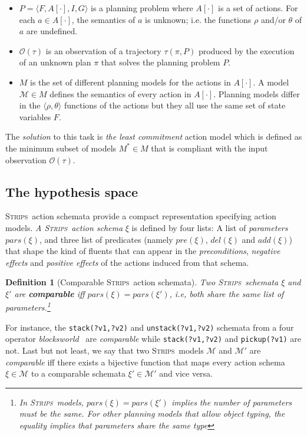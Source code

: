 \documentclass{article}
\newcommand{\tup}[1]{{\langle #1 \rangle}}
\newcommand{\strips}{\textsc{Strips}}
\newtheorem{definition}[theorem]{Definition}
\begin{document}
\begin{itemize}
\item $P=\tup{F,A[\cdot],I,G}$ is a planning problem where $A[\cdot]$ is a set of actions. For each $a\in A[\cdot]$, the semantics of $a$ is unknown; i.e. the functions $\rho$ and/or $\theta$ of $a$ are undefined.
\item $\mathcal{O}(\tau)$ is an observation of a trajectory $\tau(\pi,P)$ produced by the execution of an unknown plan $\pi$ that solves the planning problem $P$.
\item $M$ is the set of different planning models for the actions in $A[\cdot]$. A model $\mathcal{M}\in M$ defines the semantics of every action in $A[\cdot]$. Planning models differ in the $\tup{\rho,\theta}$ functions of the actions but they all use the same set of state variables $F$.
\end{itemize}

The {\em solution} to this task is {\em the least commitment} action model which is defined as the minimum subset of models $M^*\in M$ that is compliant with the input observation $\mathcal{O}(\tau)$.

\subsection{The hypothesis space}
\strips\ action schemata provide a compact representation specifying action models. {\em A \strips\ action schema} $\xi$ is defined by four lists: A list of {\em parameters} $pars(\xi)$, and three list of predicates (namely $pre(\xi)$, $del(\xi)$ and $add(\xi)$) that shape the kind of fluents that can appear in the {\em preconditions}, {\em negative effects} and {\em positive effects} of the actions induced from that schema.

\begin{definition}[Comparable \strips\ action schemata]
Two \strips\ schemata $\xi$ and $\xi'$ are {\bf comparable} iff $pars(\xi)=pars(\xi')$, i.e, both share the same list of parameters.\footnote{In \strips\ models, $pars(\xi)=pars(\xi')$ implies the number of parameters must be the same. For other planning models that allow object typing, the equality implies that parameters share the same type}
\end{definition}

For instance, the {\small\tt stack(?v1,?v2)} and {\small\tt unstack(?v1,?v2)} schemata from a four operator {\em blocksworld}~\cite{slaney2001blocks} are {\em comparable} while {\small\tt stack(?v1,?v2)} and {\small\tt pickup(?v1)} are not. Last but not least, we say that two \strips\ models $\mathcal{M}$ and $\mathcal{M}'$ are {\em comparable} iff there exists a bijective function that maps every action schema $\xi\in\mathcal{M}$ to a comparable schemata $\xi'\in\mathcal{M'}$ and vice versa.
\end{document}
